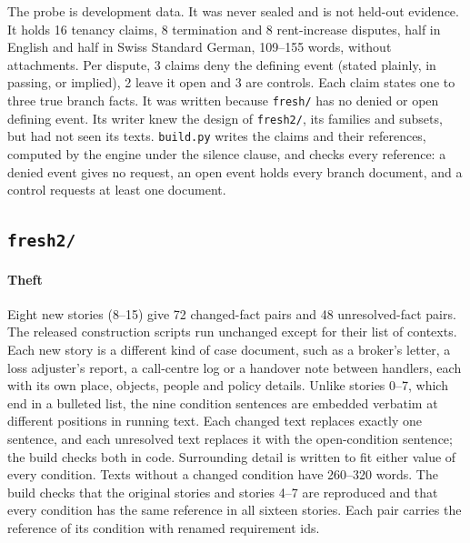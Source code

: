 The probe is development data. It was never sealed and is not held-out evidence. It holds 16 tenancy claims, 8 termination and 8 rent-increase disputes, half in English and half in Swiss Standard German, 109--155 words, without attachments. Per dispute, 3 claims deny the defining event (stated plainly, in passing, or implied), 2 leave it open and 3 are controls. Each claim states one to three true branch facts. It was written because \texttt{fresh/} has no denied or open defining event. Its writer knew the design of \texttt{fresh2/}, its families and subsets, but had not seen its texts. \texttt{build.py} writes the claims and their references, computed by the engine under the silence clause, and checks every reference: a denied event gives no request, an open event holds every branch document, and a control requests at least one document.

\subsection{\texttt{fresh2/}}
\label{app:data-fresh2}

\paragraph{Theft}
Eight new stories (8--15) give 72 changed-fact pairs and 48 unresolved-fact pairs. The released construction scripts run unchanged except for their list of contexts. Each new story is a different kind of case document, such as a broker's letter, a loss adjuster's report, a call-centre log or a handover note between handlers, each with its own place, objects, people and policy details. Unlike stories 0--7, which end in a bulleted list, the nine condition sentences are embedded verbatim at different positions in running text. Each changed text replaces exactly one sentence, and each unresolved text replaces it with the open-condition sentence; the build checks both in code. Surrounding detail is written to fit either value of every condition. Texts without a changed condition have 260--320 words. The build checks that the original stories and stories 4--7 are reproduced and that every condition has the same reference in all sixteen stories. Each pair carries the reference of its condition with renamed requirement ids.

